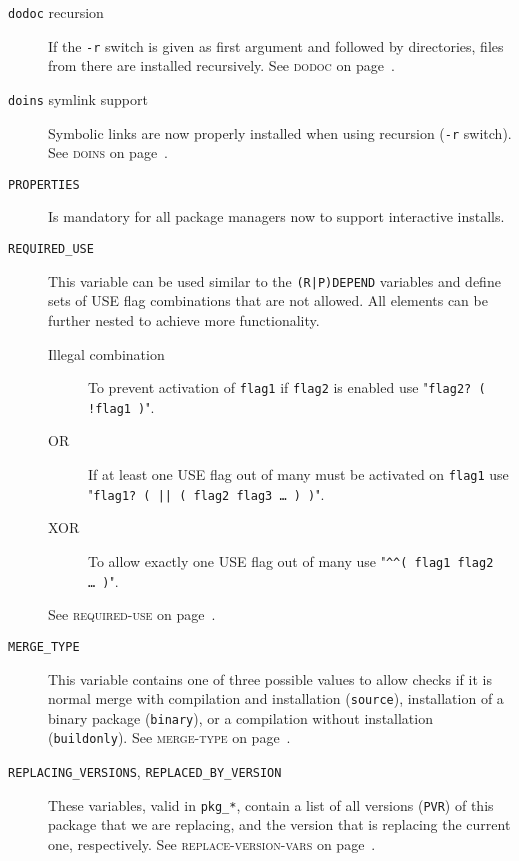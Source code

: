 \documentclass[a4paper,nofoldmark]{leaflet}
\newcommand{\code}[1]{\texttt{#1}}
\newcommand{\featureref}[1]{\textsc{#1} on page~\pageref{feat:#1}}
\begin{document}
\begin{description}
    \item[\code{dodoc} recursion] If the \code{-r} switch is given as
    first argument and followed by directories, files from there are
    installed recursively.  See \featureref{dodoc}.
    \item[\code{doins} symlink support] Symbolic links are now
    properly installed when using recursion (\code{-r} switch).
    See \featureref{doins}.
    \item[\code{PROPERTIES}] Is mandatory for all package managers now
    to support interactive installs.
    \item[\code{REQUIRED\_USE}] This variable can be used similar to
    the \code{(R|P)DEPEND} variables and define sets of USE flag
    combinations that are not allowed.  All elements can be further
    nested to achieve more functionality.
    \begin{description}
        \item[Illegal combination] To prevent activation of
        \code{flag1} if \code{flag2} is enabled use
        "\code{flag2?\ ( !flag1 )}".
        \item[OR] If at least one USE flag out of many must be
        activated on \code{flag1} use
        "\code{flag1?\ ( || ( flag2 flag3 \dots\ ) )}".
        \item[XOR] To allow exactly one USE flag out of many use
        "\code{\textasciicircum\textasciicircum ( flag1 flag2 \dots\ )}".
    \end{description}
    See \featureref{required-use}.
    \item[\code{MERGE\_TYPE}] This variable contains one of three
    possible values to allow checks if it is normal merge with
    compilation and installation (\code{source}), installation of a
    binary package (\code{binary}), or a compilation without
    installation (\code{buildonly}).  See \featureref{merge-type}.
    \item[\code{REPLACING\_VERSIONS}, \code{REPLACED\_BY\_VERSION}]
    These variables, valid in \code{pkg\_*}, contain a list of all
    versions (\code{PVR}) of this package that we are replacing, and
    the version that is replacing the current one, respectively.
    See \featureref{replace-version-vars}.
\end{description}
\end{document}
